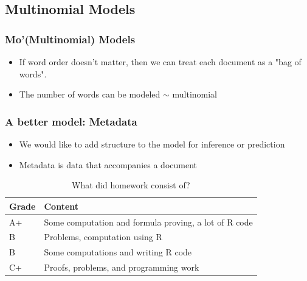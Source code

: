 \documentclass[presentation]{beamer}
\begin{document}
\subsection{Multinomial Models}
\begin{frame}
\pause
\frametitle{Mo'(Multinomial) Models}
\begin{itemize}
\item If word order doesn't matter, then we can treat each document as a "bag of words". 
\pause
\item The number of words can be modeled $\sim$ multinomial
\pause
\end{itemize}
\begin{table}[!hbpt]
\caption{Creating a word-count matrix from text}
\begin{center} 
\end{center}
\end{table} 
\end{frame}


\begin{frame}
\frametitle{A better model: Metadata}
\begin{itemize}
\item We would like to add structure to the model for inference or prediction
\pause
\item Metadata is data that accompanies a document
\pause
\end{itemize}
\begin{table}[!hbpt]
\caption{What did homework consist of?} \label{tab:title}
\pause
\begin{center}
\begin{tabular} {l l}
\textbf{Grade} & \textbf{Content} \\
\hline
A+ & Some computation and formula proving, a lot of R code \\
B & Problems, computation using R \\
B & Some computations and writing R code\\
C+ & Proofs, problems, and programming work \\  %
\end{tabular}
\end{center}
\end{table}
\end{frame}
\end{document}
